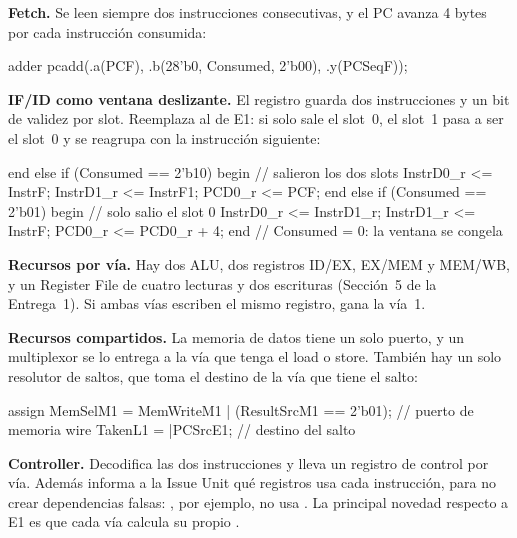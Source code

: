 \documentclass[11pt,a4paper]{article}
\newcommand{\sig}[1]{\texttt{\detokenize{#1}}}
\begin{document}
\textbf{Fetch.} Se leen siempre dos instrucciones consecutivas, y el PC avanza 4 bytes por cada instrucción consumida:

\begin{vlog}
adder pcadd(.a(PCF), .b({28'b0, Consumed, 2'b00}), .y(PCSeqF));
\end{vlog}

\textbf{IF/ID como ventana deslizante.} El registro guarda dos instrucciones y un bit de validez por slot. Reemplaza al \sig{SelD} de E1: si solo sale el slot~0, el slot~1 pasa a ser el slot~0 y se reagrupa con la instrucción siguiente:

\begin{vlog}
end else if (Consumed == 2'b10) begin       // salieron los dos slots
  InstrD0_r <= InstrF;  InstrD1_r <= InstrF1;  PCD0_r <= PCF;
end else if (Consumed == 2'b01) begin       // solo salio el slot 0
  InstrD0_r <= InstrD1_r;  InstrD1_r <= InstrF;  PCD0_r <= PCD0_r + 4;
end                                         // Consumed = 0: la ventana se congela
\end{vlog}

\textbf{Recursos por vía.} Hay dos ALU, dos registros ID/EX, EX/MEM y MEM/WB, y un Register File de cuatro lecturas y dos escrituras (Sección~5 de la Entrega~1). Si ambas vías escriben el mismo registro, gana la vía~1.

\textbf{Recursos compartidos.} La memoria de datos tiene un solo puerto, y un multiplexor se lo entrega a la vía que tenga el load o store. También hay un solo resolutor de saltos, que toma el destino de la vía que tiene el salto:

\begin{vlog}
assign MemSelM1 = MemWriteM1 | (ResultSrcM1 == 2'b01);  // puerto de memoria
wire   TakenL1  = |PCSrcE1;                             // destino del salto
\end{vlog}

\textbf{Controller.} Decodifica las dos instrucciones y lleva un registro de control por vía. Además informa a la Issue Unit qué registros usa cada instrucción, para no crear dependencias falsas: \sig{addi}, por ejemplo, no usa \sig{rs2}. La principal novedad respecto a E1 es que cada vía calcula su propio \sig{PCSrc}.
\end{document}
